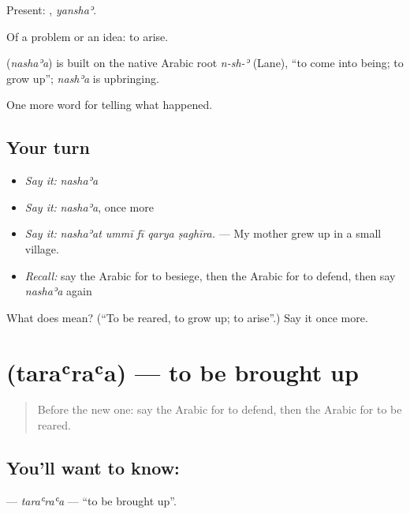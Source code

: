 Present: , \emph{yanshaʾ}.

Of a problem or an idea: to arise.

\begin{cousinweb}
\textbf{} (\emph{nashaʾa}) is built on the native Arabic root \emph{n-sh-ʾ} (Lane), \textquotedblleft{}to come into being; to grow up\textquotedblright{}; \emph{nashʾa} is upbringing.
\end{cousinweb}

\begin{grammarlens}[title={What you've built}]
One more word for telling what happened.
\end{grammarlens}

\subsection*{Your turn}
\begin{itemize}
\raggedright
  \item \emph{Say it:} \emph{nashaʾa}
  \item \emph{Say it:} \emph{nashaʾa}, once more
  \item \emph{Say it:} \emph{nashaʾat ummī fī qarya ṣaghīra.} — My mother grew up in a small village.
  \item \emph{Recall:} say the Arabic for to besiege, then the Arabic for to defend, then say \emph{nashaʾa} again
\end{itemize}

\begin{tcolorbox}[breakable,colback=teal!4,colframe=teal!35!black,title={Before you move on}]
What does  mean? (\textquotedblleft{}To be reared, to grow up; to arise\textquotedblright{}.) Say it once more.
\end{tcolorbox}
\section[\texorpdfstring{\ar{ترعرع} (taraʿraʿa)}{ترعرع (taraʿraʿa)}]{ (taraʿraʿa) — to be brought up}

\label{lesson:AR-C323-taraara}



\begin{quote}
Before the new one: say the Arabic for to defend, then the Arabic for to be reared.
\end{quote}

\subsection*{You'll want to know: }
\textbf{} — \emph{taraʿraʿa} — \textquotedblleft{}to be brought up\textquotedblright{}.

